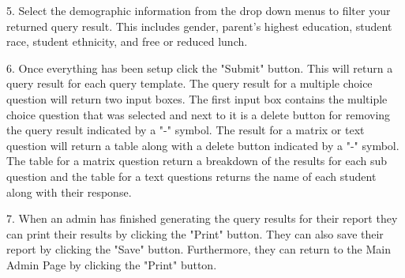 \documentclass[letterpaper,10pt,serif, draftclsnofoot,onecolumn, compsoc, titlepage]{IEEEtran}
\begin{document}
5. Select the demographic information from the drop down menus to filter your returned query result. This includes gender, parent's highest education, student race, student ethnicity, and free or reduced lunch. 

6. Once everything has been setup click the "Submit" button. This will return a query result for each query template. The query result for a multiple choice question will return two input boxes. The first input box contains the multiple choice question that was selected and next to it is a delete button for removing the query result indicated by a "-" symbol.  The result for a matrix or text question will return a table along with a delete button indicated by a "-" symbol. The table for a matrix question return a breakdown of the results for each sub question and the table for a text questions returns the name of each student along with their response. 

7. When an admin has finished generating the query results for their report they can print their results by clicking the "Print" button. They can also save their report by clicking the "Save" button. Furthermore, they can return to the Main Admin Page by clicking the "Print" button. 
\end{document}
